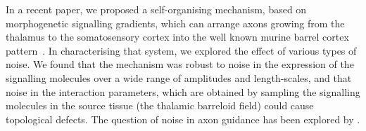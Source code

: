 \documentclass[11pt, a4paper]{article}
\begin{document}


In a recent paper, we proposed a self-organising mechanism, based on
morphogenetic signalling gradients, which can arrange
axons growing from the thalamus to the somatosensory cortex into the well
known murine barrel cortex pattern~\citep{james_modelling_2020}. In
characterising that system, we explored the effect of various types of
noise. We found that the mechanism was robust to noise in the expression of
the signalling molecules over a wide range of amplitudes and length-scales,
and that noise in the interaction parameters, which are obtained by sampling
the signalling molecules in the source tissue (the thalamic barreloid field)
could cause topological defects. The question of noise in axon guidance has
been explored by \citet{goodhill_can_2016}.



\end{document}
